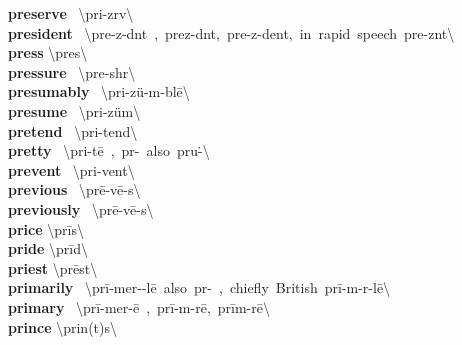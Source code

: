 \documentclass[10pt,a4paper]{article}
\begin{document}
\begin{multicols}{2}
\textbf{ preserve }\quad \ \textbackslash pri-\textprimstress z\textschwa rv\textbackslash \\
\textbf{ president }\quad \ \textbackslash \textprimstress pre-z\textschwa -d\textschwa nt\ ,\ \textprimstress prez-d\textschwa nt,\ \textprimstress pre-z\textschwa -\textsecstress dent,\ in\ rapid\ speech\ \textprimstress pre-z\textsuperscript{\textreve}nt\textbackslash \\
\textbf{ press }\quad \textbackslash \textprimstress pres\textbackslash \\
\textbf{ pressure }\quad \ \textbackslash \textprimstress pre-sh\textschwa r\textbackslash \\
\textbf{ presumably }\quad \ \textbackslash pri-\textprimstress z\"{u}-m\textschwa -bl\={e}\textbackslash \\
\textbf{ presume }\quad \ \textbackslash pri-\textprimstress z\"{u}m\textbackslash \\
\textbf{ pretend }\quad \ \textbackslash pri-\textprimstress tend\textbackslash \\
\textbf{ pretty }\quad \ \textbackslash \textprimstress pri-t\={e}\ ,\ \textprimstress p\textschwa r-\ also\ \textprimstress pru\. -\textbackslash \\
\textbf{ prevent }\quad \ \textbackslash pri-\textprimstress vent\textbackslash \\
\textbf{ previous }\quad \ \textbackslash \textprimstress pr\={e}-v\={e}-\textschwa s\textbackslash \\
\textbf{ previously }\quad \ \textbackslash \textprimstress pr\={e}-v\={e}-\textschwa s\textbackslash \\
\textbf{ price }\quad \textbackslash \textprimstress pr\={i}s\textbackslash \\
\textbf{ pride }\quad \textbackslash \textprimstress pr\={i}d\textbackslash \\
\textbf{ priest }\quad \textbackslash \textprimstress pr\={e}st\textbackslash \\
\textbf{ primarily }\quad \ \textbackslash pr\={i}-\textprimstress mer-\textschwa -l\={e}\ also\ pr\textschwa -\ ,\ chiefly\ British\ \textprimstress pr\={i}-m\textschwa -r\textschwa -l\={e}\textbackslash \\
\textbf{ primary }\quad \ \textbackslash \textprimstress pr\={i}-\textsecstress mer-\={e}\ ,\ \textprimstress pr\={i}-m\textschwa -r\={e},\ \textprimstress pr\={i}m-r\={e}\textbackslash \\
\textbf{ prince }\quad \textbackslash \textprimstress prin(t)s\textbackslash \\

\end{multicols}
\end{document}
